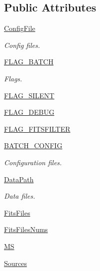 \subsection*{\-Public \-Attributes}
\begin{DoxyCompactItemize}
\item 
\hyperlink{class_pipeline_1_1_pipeline_a1ceabfd647cd5a6ea0e02ac71f158c40}{\-Config\-File}
\begin{DoxyCompactList}\small\item\em \-Config files. \end{DoxyCompactList}\item 
\hyperlink{class_pipeline_1_1_pipeline_a317e59f6680c176964093b258e448099}{\-F\-L\-A\-G\-\_\-\-B\-A\-T\-C\-H}
\begin{DoxyCompactList}\small\item\em \-Flags. \end{DoxyCompactList}\item 
\hyperlink{class_pipeline_1_1_pipeline_a5cc8f56c0337a87c280fd57cc87040db}{\-F\-L\-A\-G\-\_\-\-S\-I\-L\-E\-N\-T}
\item 
\hyperlink{class_pipeline_1_1_pipeline_a10a23125546378dbb9dc838f74dd1b89}{\-F\-L\-A\-G\-\_\-\-D\-E\-B\-U\-G}
\item 
\hyperlink{class_pipeline_1_1_pipeline_acec6e73f659e3f9823cd8b56c7e31e8e}{\-F\-L\-A\-G\-\_\-\-F\-I\-T\-S\-F\-I\-L\-T\-E\-R}
\item 
\hyperlink{class_pipeline_1_1_pipeline_a03b9a5afc3015bae8a2d92504236459e}{\-B\-A\-T\-C\-H\-\_\-\-C\-O\-N\-F\-I\-G}
\begin{DoxyCompactList}\small\item\em \-Configuration files. \end{DoxyCompactList}\item 
\hyperlink{class_pipeline_1_1_pipeline_ad8256c1fd4df9d0825bbe458ad8bce4d}{\-Data\-Path}
\begin{DoxyCompactList}\small\item\em \-Data files. \end{DoxyCompactList}\item 
\hyperlink{class_pipeline_1_1_pipeline_a4fd9cdcf2e2374767bbf8a61bf9cafc1}{\-Fits\-Files}
\item 
\hyperlink{class_pipeline_1_1_pipeline_a257557f9e4540049c52ff5a8d00350d4}{\-Fits\-Files\-Nums}
\item 
\hyperlink{class_pipeline_1_1_pipeline_adc92f011ae566e523663d39b6e6c276f}{\-M\-S}
\item 
\hyperlink{class_pipeline_1_1_pipeline_a71c040dce994954ac3926137cc5c68c3}{\-Sources}

\end{DoxyCompactItemize}
